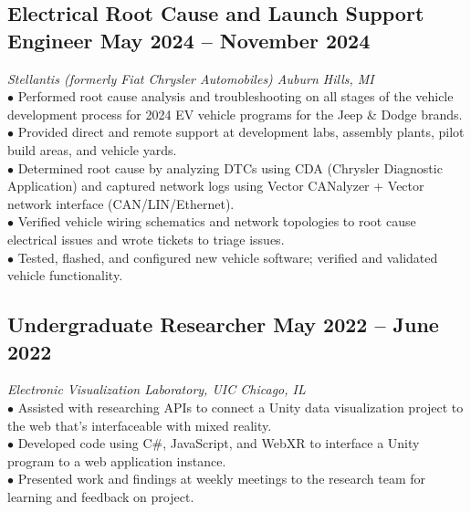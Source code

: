 \documentclass{article}
\begin{document}
\subsection{Electrical Root Cause and Launch Support Engineer \hfill \textnormal{May 2024 -- November 2024}}
\vspace{-0.5em}
\textit{Stellantis (formerly Fiat Chrysler Automobiles) \hfill Auburn Hills, MI}
\\
$\bullet$ Performed root cause analysis and troubleshooting on all stages of the vehicle development process for 2024 EV vehicle programs for the Jeep \& Dodge brands.
\\
$\bullet$ Provided direct and remote support at development labs, assembly plants, pilot build areas, and vehicle yards.
\\
$\bullet$ Determined root cause by analyzing DTCs using CDA (Chrysler Diagnostic Application) and captured network logs using Vector CANalyzer + Vector network interface (CAN/LIN/Ethernet).
\\
$\bullet$ Verified vehicle wiring schematics and network topologies to root cause electrical issues and wrote tickets to triage issues.
\\
$\bullet$ Tested, flashed, and configured new vehicle software; verified and validated vehicle functionality.
\vspace{-0.5em}

\subsection{Undergraduate Researcher \hfill \textnormal{May 2022 -- June 2022}}
\vspace{-0.5em}
\textit{Electronic Visualization Laboratory, UIC \hfill Chicago, IL}
\\
$\bullet$ Assisted with researching APIs to connect a Unity data visualization project to the web that's interfaceable with mixed reality.
\\
$\bullet$ Developed code using C\#, JavaScript, and WebXR to interface a Unity program to a web application instance.
\\
$\bullet$ Presented work and findings at weekly meetings to the research team for learning and feedback on project.
\vspace{-0.5em}
\end{document}
